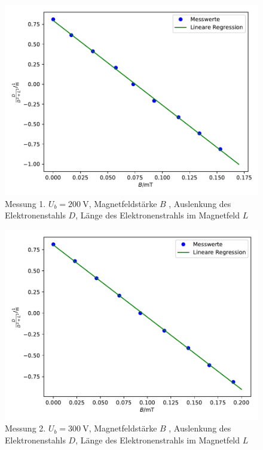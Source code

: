 \begin{figure}
  \centering
  \includegraphics[scale = 0.7]{Plot2.1.pdf}
  \caption{Messung 1. $ U_b = \SI{200}{\volt}$, Magnetfeldstärke $B$ , Auslenkung des Elektronenstahls $D$, Länge des Elektronenstrahls im Magnetfeld $L$}
  \label{abb:7}
\end{figure}
\begin{figure}
  \centering
  \includegraphics[scale = 0.7]{Plot2.2.pdf}
  \caption{Messung 2. $ U_b = \SI{300}{\volt}$, Magnetfeldstärke $B$ , Auslenkung des Elektronenstahls $D$, Länge des Elektronenstrahls im Magnetfeld $L$}
  \label{abb:8}
\end{figure}
